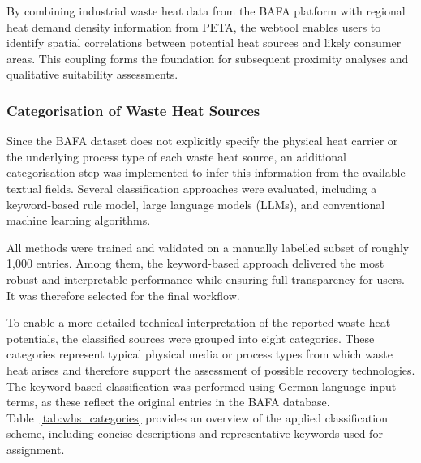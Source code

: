 \documentclass[letterpaper,11pt]{article}
\begin{document}
By combining industrial waste heat data from the BAFA platform with regional heat demand density information from PETA, the webtool enables users to identify spatial correlations between potential heat sources and likely consumer areas. This coupling forms the foundation for subsequent proximity analyses and qualitative suitability assessments.

\subsubsection{Categorisation of Waste Heat Sources}

Since the BAFA dataset does not explicitly specify the physical heat carrier or the underlying process type of each waste heat source, an additional categorisation step was implemented to infer this information from the available textual fields. Several classification approaches were evaluated, including a keyword-based rule model, large language models (LLMs), and conventional machine learning algorithms.

All methods were trained and validated on a manually labelled subset of roughly 1,000 entries. Among them, the keyword-based approach delivered the most robust and interpretable performance while ensuring full transparency for users. It was therefore selected for the final workflow.

To enable a more detailed technical interpretation of the reported waste heat potentials, the classified sources were grouped into eight categories. 
These categories represent typical physical media or process types from which waste heat arises and therefore support the assessment of possible recovery technologies.
The keyword-based classification was performed using German-language input terms, as these reflect the original entries in the BAFA database.
Table~\ref{tab:whs_categories} provides an overview of the applied classification scheme, including concise descriptions and representative keywords used for assignment.
\end{document}
